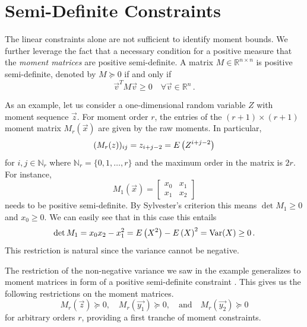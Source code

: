 \section{Semi-Definite Constraints}
The linear constraints alone are not sufficient to identify moment bounds.
We further leverage the fact that a necessary condition for a
positive measure that the \emph{moment matrices}
are positive semi-definite.
A matrix $M\in\mathbb{R}^{n\times n}$ is positive semi-definite,
denoted by  $M\succeq 0$ if and only if
\[
  {\vec v}^T M{\vec v} \geq 0\quad \forall \vec v\in\mathbb{R}^n\,.
\]
\begin{example}
  As an example, let us consider a one-dimensional random variable $Z$
  with moment sequence $\vec z$.
  For  moment order $r$,
  the entries of the $(r+1)\times (r+1)$ moment matrix $M_r(\vec x)$
  are given by
  the raw moments.
  In particular,
  \[
    (M_r({z}))_{ij}=z_{i+j-2}={E}\left(Z^{i+j-2}\right)
  \]
  for
  $i,j\in\mathbb{N}_r$ where $\mathbb{N}_r=\{0,1,\dots,r\}$ and the
  maximum order in the matrix is $2r$.
  For instance,
  \begin{equation}
    \label{eq:m1_dim}
    M_1(\vec x) =
    \begin{bmatrix}
      x_0 & x_1 \\
      x_1 & x_2
    \end{bmatrix}
  \end{equation}
  needs to be positive semi-definite. By Sylvester's criterion this means $\det
  M_1\geq 0$ and $x_0\geq 0$.
  We can easily see that in this case this entails
  \[
    \det M_1=x_0x_2 - x_1^2={E}\left(X^2\right)-{E}\left(X\right)^2
    =\operatorname*{Var}({X})
    \geq 0\,.
  \]
  This restriction is natural since the variance cannot be negative.
\end{example}
The restriction of the non-negative variance we saw in the example generalizes
to moment matrices in form of a positive semi-definite constraint
\parencite{parrilo2003semidefinite}.
This gives us the following restrictions on the moment matrices.
\begin{equation}\label{eq:sd_constraints}
  M_r(\vec{z})\succeq 0, \quad M_r(\vec{y_1})\succeq
  0,\quad\text{and}\quad M_r(\vec{y_2})\succeq 0
\end{equation}
for arbitrary orders $r$, providing a first tranche of moment constraints.

